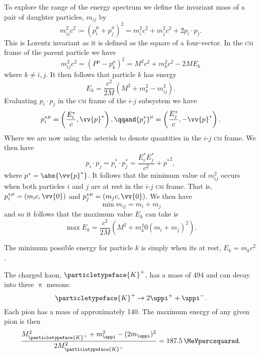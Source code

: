 \documentclass[fleqn]{NotesClass}
\makeatletter
\newcommand{\PBASE@kaon}{\ensuremath{\particletypeface{K}}}
\newcommand{\Pkaonplus}{\ensuremath{\PBASE@kaon^+}}
\newcommand{\PBASE@pion}{\ensuremath{\uppi}}
\newcommand{\PBASE@pion}{\ensuremath{\pi}}
\newcommand{\Ppion}{\PBASE@pion}
\newcommand{\Ppionplus}{\ensuremath{\Ppion^+}}
\newcommand{\Ppionminus}{\ensuremath{\Ppion^-}}
\newcommand{\Ppi}{\Ppion}
\newcommand{\Ppip}{\Ppionplus}
\newcommand{\Ppim}{\Ppionminus}
\newcommand{\CM}{\textsc{cm}}
\makeatother
\begin{document}
    To explore the range of the energy spectrum we define the invariant mass of a pair of daughter particles, \(m_{ij}\) by
    \begin{equation}
        m_{ij}^2c^2 \coloneqq (p_i^\mu + p_j^\mu)^2 = m_i^2c^2 + m_j^2c^2 + 2p_i\cdot p_j.
    \end{equation}
    This is Lorentz invariant as it is defined as the square of a four-vector.
    In the \CM{} frame of the parent particle we have
    \begin{equation}
        m_{ij}^2c^2 = (P^\mu - p_k^\mu)^2 = M^2c^2 + m_k^2c^2 - 2ME_k
    \end{equation}
    where \(k \ne i, j\).
    It then follows that particle \(k\) has energy
    \begin{equation}
        E_k = \frac{c^2}{2M}(M^2 + m_k^2 - m_{ij}^2).
    \end{equation}
    Evaluating \(p_i\cdot p_j\) in the \CM{} frame of the \(i\)-\(j\) subsystem we have
    \begin{equation}
        {p_i^*}^\mu = \left( \frac{E_i^*}{c}, \vv{p}^* \right), \qqand {p_j^*}^\mu = \left( \frac{E_j^*}{c}, -\vv{p}^* \right).
    \end{equation}
    Where we are now using the asterisk to denote quantities in the \(i\)-\(j\) \CM{} frame.
    We then have
    \begin{equation}
        p_i \cdot p_j = p_i^* \cdot p_j^* = \frac{E_i^*E_j^*}{c^2} + {p^*}^2,
    \end{equation}
    where \(p^* = \abs{\vv{p}^*}\).
    It follows that the minimum value of \(m_{ij}^2\) occurs when both particles \(i\) and \(j\) are at rest in the \(i\)-\(j\) \CM{} frame.
    That is, \({p_i^*}^\mu = (m_ic, \vv{0})\) and \({p_j^*}^\mu = (m_jc, \vv{0})\).
    We then have
    \begin{equation}
        \min m_{ij} = m_i + m_j
    \end{equation}
    and so it follows that the maximum value \(E_k\) can take is
    \begin{equation}
        \max E_k = \frac{c^2}{2M}(M^2 + m_k^2 0 (m_i + m_j)^2).
    \end{equation}
    
    The minimum possible energy for particle \(k\) is simply when its at rest, \(E_k = m_kc^2\).
    
    \begin{exm}{}{}
        The charged kaon, \Pkaonplus, has a mass of \qty{494}{\MeVpercsquared} and can decay into three \Ppi{} mesons:
        \begin{equation}
            \Pkaonplus \to 2\Ppip + \Ppim.
        \end{equation}
        Each pion has a mass of approximately \qty{140}{\MeVpercsquared}.
        The maximum energy of any given pion is then
        \begin{equation}
            \frac{M_{\Pkaonplus}^2 + m_{\Ppi}^2 - (2m_{\Ppi})^2}{2M_{\Pkaonplus}^2} = \qty{187.5}{\MeVpercsquared}.
        \end{equation}
    \end{exm}
    
\end{document}
